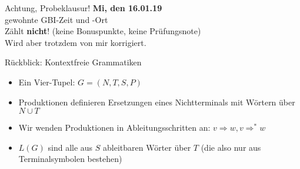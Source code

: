 



\morescalingdelimiters




\framePrevEpisode

\begin{frame}{Achtung, Probeklausur!}
	\textbf{Mi, den 16.01.19} \\
	gewohnte GBI-Zeit und -Ort \\
	Zählt \textbf{nicht}! {\small (keine Bonuspunkte, keine Prüfungsnote)}\\
	Wird aber trotzdem von mir korrigiert. \smiley
\end{frame}


\begin{frame}{Rückblick: Kontextfreie Grammatiken}
	\begin{itemize}[<+->]
		\item Ein Vier-Tupel: $G = (N, T, S, P)$
		\item Produktionen definieren Ersetzungen eines Nichtterminals mit Wörtern über $N \cup T$
		\item Wir wenden Produktionen in Ableitungsschritten an: $v \Rightarrow w, v \Rightarrow^* w$
		\item $L(G)$ sind alle aus $S$ ableitbaren Wörter über $T$ (die also nur aus Terminalsymbolen bestehen)
	\end{itemize}
\end{frame}

